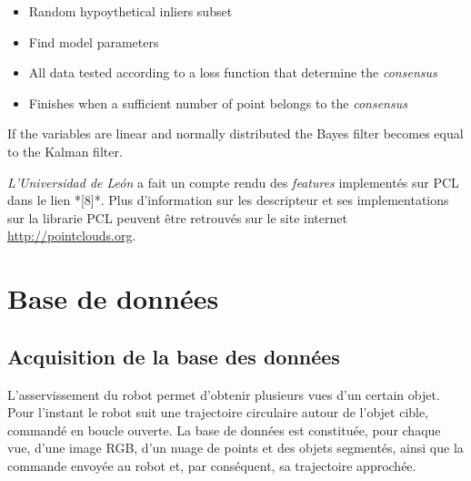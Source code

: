 \begin{itemize}
  \item Random hypoythetical inliers subset
  \item Find model parameters
  \item All data tested according to a loss function that determine the \textit{consensus}
  \item Finishes when a sufficient number of point belongs to the \textit{consensus}
\end{itemize}

\center \large{\color{blue} If the variables are linear and normally distributed the Bayes filter becomes equal to the Kalman filter.}



\textit{L'Universidad de León } a fait un compte rendu des
\textit{features} implementés sur PCL dans le lien *[8]*. Plus
d'information sur les descripteur et ses implementations sur la
librarie PCL peuvent être retrouvés sur le site
internet \url{http://pointclouds.org}.


\section{ Base de données}

\subsection{Acquisition de la base des données}
L'asservissement du robot permet d'obtenir plusieurs vues d'un certain objet. Pour l'instant le robot suit une trajectoire circulaire autour de l'objet cible, commandé en boucle ouverte. La base de données est constituée, pour chaque vue, d'une image RGB, d'un nuage de points et des objets segmentés, ainsi que la commande envoyée au robot et, par conséquent, sa trajectoire approchée.

